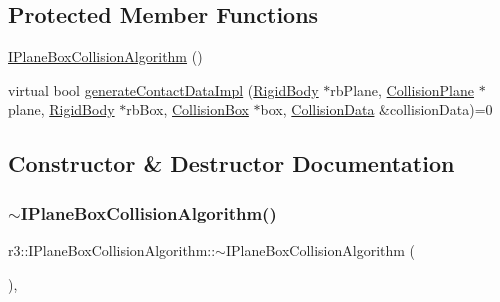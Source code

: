 \subsection*{Protected Member Functions}
\begin{DoxyCompactItemize}
\item 
\mbox{\hyperlink{classr3_1_1_i_plane_box_collision_algorithm_a73cced571b18b06ac13e67d7bae5f10a}{I\+Plane\+Box\+Collision\+Algorithm}} ()
\item 
virtual bool \mbox{\hyperlink{classr3_1_1_i_plane_box_collision_algorithm_a48f6ca7613a0cc7c64d8e0cfe34674e8}{generate\+Contact\+Data\+Impl}} (\mbox{\hyperlink{classr3_1_1_rigid_body}{Rigid\+Body}} $\ast$rb\+Plane, \mbox{\hyperlink{classr3_1_1_collision_plane}{Collision\+Plane}} $\ast$plane, \mbox{\hyperlink{classr3_1_1_rigid_body}{Rigid\+Body}} $\ast$rb\+Box, \mbox{\hyperlink{classr3_1_1_collision_box}{Collision\+Box}} $\ast$box, \mbox{\hyperlink{classr3_1_1_collision_data}{Collision\+Data}} \&collision\+Data)=0
\end{DoxyCompactItemize}


\subsection{Constructor \& Destructor Documentation}
\mbox{\label{classr3_1_1_i_plane_box_collision_algorithm_a1a1d1348a9e42970cfa770fa6017d4ed}} 
\subsubsection{\texorpdfstring{$\sim$\+I\+Plane\+Box\+Collision\+Algorithm()}{~IPlaneBoxCollisionAlgorithm()}}
{\footnotesize\ttfamily r3\+::\+I\+Plane\+Box\+Collision\+Algorithm\+::$\sim$\+I\+Plane\+Box\+Collision\+Algorithm (\begin{DoxyParamCaption}{ }\end{DoxyParamCaption})\hspace{0.3cm}{\ttfamily [virtual]}, {\ttfamily [default]}}

\mbox{\label{classr3_1_1_i_plane_box_collision_algorithm_a73cced571b18b06ac13e67d7bae5f10a}} 
